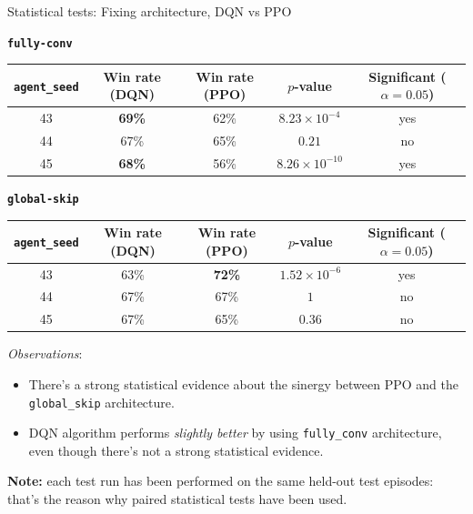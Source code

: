\begin{frame}{Statistical tests: Fixing architecture, DQN vs PPO}

  \textbf{\texttt{fully-conv}}
  \vspace{-0.2em}
  {\scriptsize
    \centering
    \setlength{\tabcolsep}{3pt}
    \renewcommand{\arraystretch}{0.85}

    \begin{tabular}{c|cccc}
      \texttt{agent\_seed}
         &
      Win rate (DQN)
         &
      Win rate (PPO)
         &
      $p$-value
         &
      Significant ($\alpha=0.05$)
      \\
      \hline
      43 & \color{goodgreen}\textbf{69\%} & 62\% & $8.23 \times 10^{-4}$  & yes \\
      44 & 67\%                           & 65\% & $0.21$                 & no  \\
      45 & \color{goodgreen}\textbf{68\%} & 56\% & $8.26 \times 10^{-10}$ & yes
    \end{tabular}

    \par}
  \vspace{0.15em}

  \textbf{\texttt{global-skip}}
  \vspace{-0.2em}
  {\scriptsize
    \centering
    \setlength{\tabcolsep}{3pt}
    \renewcommand{\arraystretch}{0.85}

    \begin{tabular}{c|cccc}
      \texttt{agent\_seed}
         &
      Win rate (DQN)
         &
      Win rate (PPO)
         &
      $p$-value
         &
      Significant ($\alpha=0.05$)
      \\
      \hline
      43 & 63\% & \color{goodgreen}\textbf{72\%} & $1.52 \times 10^{-6}$ & yes \\
      44 & 67\% & 67\%                           & $1$                   & no  \\
      45 & 67\% & 65\%                           & $0.36$                & no
    \end{tabular}

    \par}

  \footnotesize{
    \textit{Observations}:
    \begin{itemize}
      \item There's a strong statistical evidence about the sinergy
            between PPO and the \texttt{global\_skip} architecture.
      \item DQN algorithm performs \textit{slightly better} by using \texttt{fully\_conv}
            architecture, even though there's not a strong statistical evidence.
    \end{itemize}
  }
  \scriptsize{
    \textbf{Note:} each test run has been performed on the same held-out test episodes: that's the reason why paired statistical tests have been used.
  }

\end{frame}
